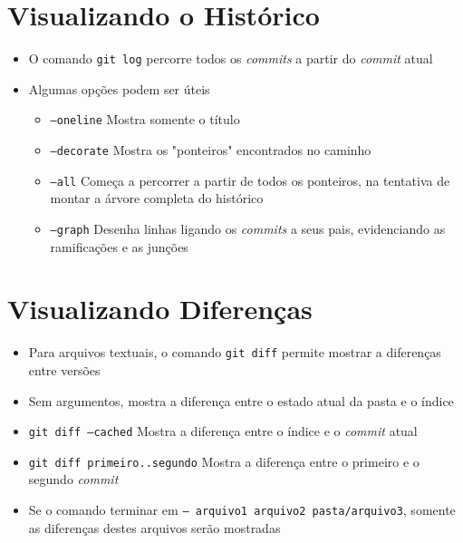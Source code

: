 \documentclass{beamer}
\newenvironment{slide}{\begin{frame}{\insertsection}}{\end{frame}}
\begin{document}
\section{Visualizando o Histórico}
\begin{slide}
    \begin{itemize}
        \item O comando \texttt{git log} percorre todos os \emph{commits} a
            partir do \emph{commit} atual
        \pause
        \item Algumas opções podem ser úteis
        \begin{itemize}
            \pause
            \item \texttt{--oneline} Mostra somente o título
            \pause
            \item \texttt{--decorate} Mostra os "ponteiros" encontrados no
                caminho
            \pause
            \item \texttt{--all} Começa a percorrer a partir de todos os
                ponteiros, na tentativa de montar a árvore completa do histórico
            \pause
            \item \texttt{--graph} Desenha linhas ligando os \emph{commits} a
                seus pais, evidenciando as ramificações e as junções
        \end{itemize}
    \end{itemize}
\end{slide}

\section{Visualizando Diferenças}
\begin{slide}
    \begin{itemize}
        \item Para arquivos textuais, o comando \texttt{git diff} permite
            mostrar a diferenças entre versões
        \pause
        \item Sem argumentos, mostra a diferença entre o estado atual da pasta
            e o índice
        \pause
        \item \texttt{git diff --cached} Mostra a diferença entre o índice e o
            \emph{commit} atual
        \pause
        \item \texttt{git diff primeiro..segundo} Mostra a diferença entre o
            primeiro e o segundo \emph{commit}
        \pause
        \item Se o comando terminar em \texttt{-- arquivo1 arquivo2
            pasta/arquivo3}, somente as diferenças destes arquivos serão
            mostradas
    \end{itemize}
\end{slide}
\end{document}
